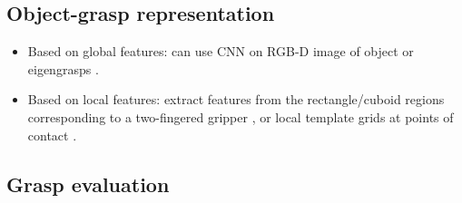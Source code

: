 \documentclass[runningheads]{../llncs}
\begin{document}
\subsection{Object-grasp representation}

\begin{itemize}
    \item Based on global features: can use CNN on RGB-D image of object \cite{mahler2017} or eigengrasps
            \cite{Ciocarlie2009,Goldfeder2011}.
    \item Based on local features: extract features from the rectangle/cuboid regions corresponding to a two-fingered
            gripper \cite{Detry2012,lenz2015,jiang2011}, or local template grids at points of contact
            \cite{Kappler2015}.
\end{itemize}

\subsection{Grasp evaluation}
\end{document}
